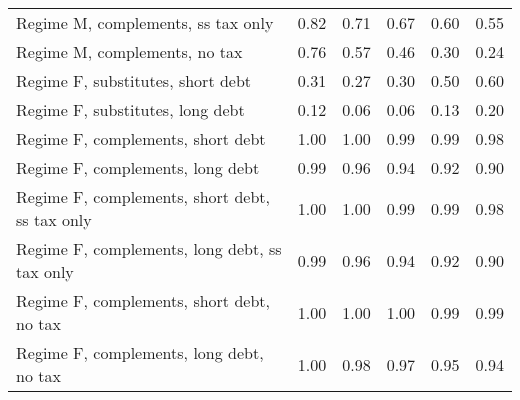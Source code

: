 \documentclass[letterpaper,12pt]{article}%
\begin{document}
\begin{table}[H]
\begin{tabular}{l c c c c c}
     \quad Regime M, complements, ss tax only & 0.82 & 0.71 &  0.67 & 0.60 & 0.55  \\
     \quad Regime M, complements, no tax &  0.76  & 0.57  & 0.46 & 0.30  & 0.24  \\
     \quad Regime F, substitutes, short debt & 0.31 & 0.27  & 0.30  & 0.50 & 0.60  \\
     \quad Regime F, substitutes, long debt &   0.12 & 0.06  & 0.06 & 0.13  & 0.20  \\
     \quad Regime F, complements, short debt &  1.00 &  1.00 & 0.99  & 0.99 & 0.98  \\
     \quad Regime F, complements, long debt &  0.99 & 0.96  & 0.94 & 0.92  &  0.90 \\
     \quad Regime F, complements, short debt, ss tax only &  1.00 &  1.00 &  0.99 & 0.99 & 0.98 \\
     \quad Regime F, complements, long debt, ss tax only &  0.99  & 0.96 & 0.94 & 0.92  & 0.90 \\
     \quad Regime F, complements, short debt, no tax &  1.00 & 1.00 &  1.00 & 0.99 & 0.99 \\
     \quad Regime F, complements, long debt, no tax &    1.00  & 0.98  & 0.97 & 0.95 & 0.94 \\
    \bottomrule    
    \end{tabular}
    \label{tab:my_label}
\end{table}
\end{document}
